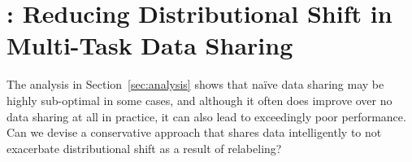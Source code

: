 

\vspace{-5pt}
\section{\cdsmethodname: Reducing Distributional Shift in Multi-Task Data Sharing}
\label{sec:method}
\vspace{-5pt}
The analysis in Section~\ref{sec:analysis} shows that na\"ive data sharing may be highly sub-optimal in some cases, and although it often does improve over no data sharing at all in practice, it can also lead to exceedingly poor performance. Can we devise a conservative approach that shares data intelligently to not exacerbate distributional shift as a result of relabeling?

